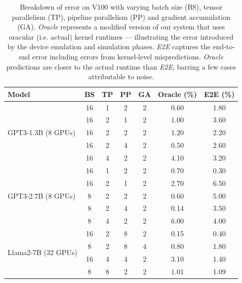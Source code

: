 \begin{table}[htbp]
\vspace{1em}
\centering
\begin{tabular}{p{1.8cm}cccccc}
\toprule
\textbf{Model} & \textbf{BS} & \textbf{TP} & \textbf{PP} & \textbf{GA} & \textbf{Oracle} (\%) & \textbf{E2E} (\%) \\
\midrule
\multirow{5}{*}{\parbox{1.8cm}{GPT3-1.3B \newline (8 GPUs)}} 
  & 16 & 1 & 2 & 2 & 0.60 & 1.80 \\
  & 16 & 2 & 1 & 2 & 1.00 & 3.60 \\
  & 16 & 2 & 2 & 2 & 1.20 & 2.20 \\
  & 16 & 2 & 4 & 2 & 0.50 & 2.60 \\
  & 16 & 4 & 2 & 2 & 4.10 & 3.20 \\
\midrule
\multirow{5}{*}{\parbox{1.8cm}{GPT3-2.7B \newline (8 GPUs)}} 
  & 16 & 1 & 2 & 2 & 0.70 & 0.30 \\
  & 16 & 2 & 1 & 2 & 2.70 & 6.50 \\
  & 8  & 2 & 2 & 2 & 0.60 & 5.00 \\
  & 8  & 2 & 4 & 2 & 0.14 & 3.50 \\
  & 8  & 4 & 2 & 2 & 6.00 & 4.00 \\
\midrule
\multirow{5}{*}{\parbox{1.8cm}{Llama2-7B \newline (32 GPUs) \newline}} 
  & 16 & 2 & 8 & 2 & 0.15 & 0.40 \\
  & 8 & 2 & 8 & 4 & 0.80 & 1.80 \\
  & 16 & 4 & 4 & 2 & 3.10 & 1.40 \\
  & 8  & 8 & 2 & 2 & 1.01 & 1.09 \\
\bottomrule
\end{tabular}
\caption{Breakdown of error on V100 with varying batch size (BS), tensor parallelism (TP), pipeline parallelism (PP) and gradient accumulation (GA). \textit{Oracle} represents a modified version of our system that uses oracular (i.e. actual) kernel runtimes --- illustrating the error introduced by the device emulation and simulation phases. \textit{E2E} captures the end-to-end error including errors from kernel-level mispredictions. \textit{Oracle} predictions are closer to the actual runtime than \textit{E2E}, barring a few cases attributable to noise.}
\label{tab:oracle_fidelity}
\end{table}


